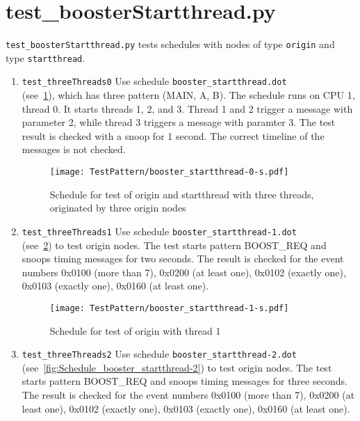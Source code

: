 \documentclass[12pt,a4paper]{report}
\begin{document}
\section{test\_boosterStartthread.py}
\texttt{test\_boosterStartthread.py} tests schedules with nodes of
type \texttt{origin} and type \texttt{startthread}.
\begin{enumerate}
\item \texttt{test\_threeThreads0}
Use schedule \texttt{booster\_startthread.dot} \\
 (see~\ref{fig:Schedule_booster_startthread-0}),
which has three pattern (MAIN, A, B). The schedule runs on CPU 1, thread 0.
It starts threads 1, 2, and 3. Thread 1 and 2 trigger a message with parameter 2,
while thread 3 triggers a message with paramter 3. The test result is
checked with a snoop for 1 second. The correct timeline of the messages
is not checked.
    \begin{figure}
        \centering
        \texttt{[image: TestPattern/booster\_startthread-0-s.pdf]}
        \caption{Schedule for test of origin and startthread with three
        threads, originated by three origin nodes}
        \label{fig:Schedule_booster_startthread-0}
    \end{figure}
\item \texttt{test\_threeThreads1}
Use schedule \texttt{booster\_startthread-1.dot} \\
(see~\ref{fig:Schedule_booster_startthread-1}) to test
origin nodes. The test starts pattern BOOST\_REQ and snoops timing messages
for two seconds. The result is checked for the event numbers
0x0100 (more than 7), 0x0200 (at least one), 0x0102 (exactly one),
0x0103 (exactly one), 0x0160 (at least one).
    \begin{figure}
        \centering
        \texttt{[image: TestPattern/booster\_startthread-1-s.pdf]}
        \caption{Schedule for test of origin with thread 1}
        \label{fig:Schedule_booster_startthread-1}
    \end{figure}
\item \texttt{test\_threeThreads2}
Use schedule \texttt{booster\_startthread-2.dot} \\
(see~\ref{fig:Schedule_booster_startthread-2}) to test
origin nodes. The test starts pattern BOOST\_REQ and snoops timing messages
for three seconds. The result is checked for the event numbers
0x0100 (more than 7), 0x0200 (at least one), 0x0102 (exactly one),
0x0103 (exactly one), 0x0160 (at least one).

\end{enumerate}
\end{document}
